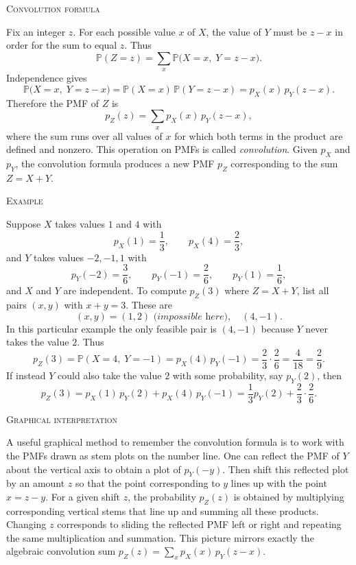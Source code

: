 \textsc{Convolution formula}

Fix an integer \(z\).  
For each possible value \(x\) of \(X\), the value of \(Y\) must be \(z-x\) in order for the sum to equal \(z\).  
Thus
\[
\mathbb{P}(Z = z)
=
\sum_{x} \mathbb{P}\big(X = x,\; Y = z-x\big).
\]
Independence gives
\[
\mathbb{P}\big(X = x,\; Y = z-x\big)
=
\mathbb{P}(X = x)\,\mathbb{P}(Y = z-x)
=
p_X(x)\,p_Y(z-x).
\]
Therefore the PMF of \(Z\) is
\[
p_Z(z)
=
\sum_{x} p_X(x)\,p_Y(z-x),
\]
where the sum runs over all values of \(x\) for which both terms in the product are defined and nonzero.  
This operation on PMFs is called \textit{convolution}.  
Given \(p_X\) and \(p_Y\), the convolution formula produces a new PMF \(p_Z\) corresponding to the sum \(Z = X+Y\).

\textsc{Example}

Suppose \(X\) takes values \(1\) and \(4\) with
\[
p_X(1) = \frac{1}{3},
\qquad
p_X(4) = \frac{2}{3},
\]
and \(Y\) takes values \(-2,-1,1\) with
\[
p_Y(-2) = \frac{3}{6},
\qquad
p_Y(-1) = \frac{2}{6},
\qquad
p_Y(1) = \frac{1}{6},
\]
and \(X\) and \(Y\) are independent.  
To compute \(p_Z(3)\) where \(Z = X+Y\), list all pairs \((x,y)\) with \(x+y=3\).  
These are
\[
(x,y) = (1,2) \textit{ (impossible here)}, \quad (4,-1).
\]
In this particular example the only feasible pair is \((4,-1)\) because \(Y\) never takes the value \(2\).  
Thus
\[
p_Z(3)
=
\mathbb{P}(X = 4,\; Y = -1)
=
p_X(4)\,p_Y(-1)
=
\frac{2}{3}\cdot\frac{2}{6}
=
\frac{4}{18}
=
\frac{2}{9}.
\]
If instead \(Y\) could also take the value \(2\) with some probability, say \(p_Y(2)\), then
\[
p_Z(3)
=
p_X(1)\,p_Y(2)
+
p_X(4)\,p_Y(-1)
=
\frac{1}{3}p_Y(2)
+
\frac{2}{3}\cdot\frac{2}{6}.
\]

\textsc{Graphical interpretation}

A useful graphical method to remember the convolution formula is to work with the PMFs drawn as stem plots on the number line.  
One can reflect the PMF of \(Y\) about the vertical axis to obtain a plot of \(p_Y(-y)\).  
Then shift this reflected plot by an amount \(z\) so that the point corresponding to \(y\) lines up with the point \(x = z-y\).  
For a given shift \(z\), the probability \(p_Z(z)\) is obtained by multiplying corresponding vertical stems that line up and summing all these products.  
Changing \(z\) corresponds to sliding the reflected PMF left or right and repeating the same multiplication and summation.  
This picture mirrors exactly the algebraic convolution sum \(p_Z(z) = \sum_x p_X(x)\,p_Y(z-x)\).




